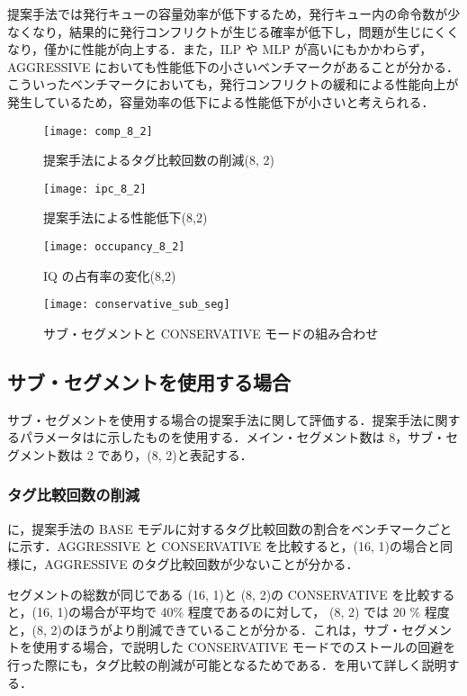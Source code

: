 提案手法では発行キューの容量効率が低下するため，発行キュー内の命令数が少なくなり，結果的に発行コンフリクトが生じる確率が低下し，問題が生じにくくなり，僅かに性能が向上する．また，ILP や MLP が高いにもかかわらず，AGGRESSIVE においても性能低下の小さいベンチマークがあることが分かる．こういったベンチマークにおいても，発行コンフリクトの緩和による性能向上が発生しているため，容量効率の低下による性能低下が小さいと考えられる．

\begin{figure}[htb]
  \centering
  \texttt{[image: comp\_8\_2]}
  \caption{提案手法によるタグ比較回数の削減(8, 2)}
  \label{fig:comp_8_2}
\end{figure}
\begin{figure}[htb]
  \centering
  \texttt{[image: ipc\_8\_2]}
  \caption{提案手法による性能低下(8,2)}
  \label{fig:ipc_8_2}
\end{figure}
\begin{figure}[htb]
  \centering
  \texttt{[image: occupancy\_8\_2]}
  \caption{IQ の占有率の変化(8,2)}
  \label{fig:occupancy_8_2}
\end{figure}
\begin{figure}[htb]
  \centering
  \texttt{[image: conservative\_sub\_seg]}
  \caption{サブ・セグメントと CONSERVATIVE モードの組み合わせ}
  \label{fig:conservative_sub_seg}
\end{figure}

\subsection{サブ・セグメントを使用する場合}
サブ・セグメントを使用する場合の提案手法に関して評価する．提案手法に関するパラメータはに示したものを使用する．メイン・セグメント数は 8，サブ・セグメント数は 2 であり，(8, 2)と表記する．

\subsubsection{タグ比較回数の削減}
に，提案手法の BASE モデルに対するタグ比較回数の割合をベンチマークごとに示す．AGGRESSIVE と CONSERVATIVE を比較すると，(16, 1)の場合と同様に，AGGRESSIVE のタグ比較回数が少ないことが分かる．

セグメントの総数が同じである (16, 1)と (8, 2)の CONSERVATIVE を比較すると，(16, 1)の場合が平均で 40\% 程度であるのに対して， (8, 2) では 20 \% 程度と，(8, 2)のほうがより削減できていることが分かる．これは，サブ・セグメントを使用する場合，で説明した CONSERVATIVE モードでのストールの回避を行った際にも，タグ比較の削減が可能となるためである．を用いて詳しく説明する．

